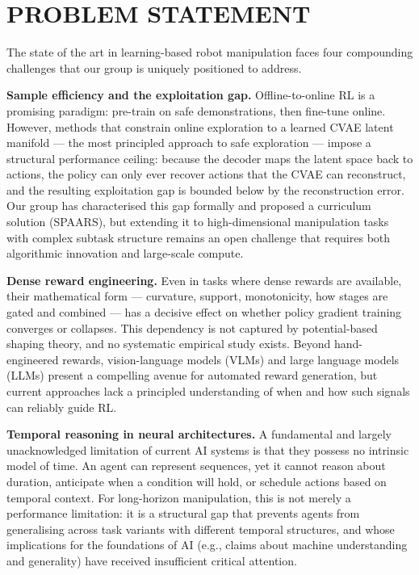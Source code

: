 \documentclass[11pt,a4paper]{article}
\begin{document}
\section*{PROBLEM STATEMENT}

The state of the art in learning-based robot manipulation faces four compounding
challenges that our group is uniquely positioned to address.

\textbf{Sample efficiency and the exploitation gap.}
Offline-to-online RL is a promising paradigm: pre-train on safe demonstrations, then
fine-tune online.
However, methods that constrain online exploration to a learned CVAE latent manifold ---
the most principled approach to safe exploration --- impose a structural performance
ceiling: because the decoder maps the latent space back to actions, the policy can only
ever recover actions that the CVAE can reconstruct, and the resulting exploitation gap
is bounded below by the reconstruction error.
Our group has characterised this gap formally and proposed a curriculum solution
(SPAARS), but extending it to high-dimensional manipulation tasks with complex subtask
structure remains an open challenge that requires both algorithmic innovation and
large-scale compute.

\textbf{Dense reward engineering.}
Even in tasks where dense rewards are available, their mathematical form --- curvature,
support, monotonicity, how stages are gated and combined --- has a decisive effect on
whether policy gradient training converges or collapses.
This dependency is not captured by potential-based shaping theory, and no systematic
empirical study exists.
Beyond hand-engineered rewards, vision-language models (VLMs) and large language models
(LLMs) present a compelling avenue for automated reward generation, but current
approaches lack a principled understanding of when and how such signals can reliably
guide RL.

\textbf{Temporal reasoning in neural architectures.}
A fundamental and largely unacknowledged limitation of current AI systems is that they
possess no intrinsic model of time.
An agent can represent sequences, yet it cannot reason about duration, anticipate when
a condition will hold, or schedule actions based on temporal context.
For long-horizon manipulation, this is not merely a performance limitation: it is a
structural gap that prevents agents from generalising across task variants with
different temporal structures, and whose implications for the foundations of AI
(e.g., claims about machine understanding and generality) have received insufficient
critical attention.
\end{document}
